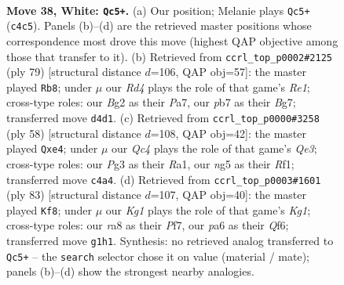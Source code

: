 \documentclass[11pt]{article}
\begin{document}
\clearpage

\begin{figure}[p]\centering
\begin{subfigure}{0.46\textwidth}\centering
\resizebox{\linewidth}{!}{%
\newchessgame
\chessboard[
  setfen={r7/1p4p1/pkn2pN1/6np/2QR4/4P1P1/PPR2PBP/6K1 w - - 5 38},
  showmover=false,
  pgfstyle=straightmove, color=movearrow, markmove={c4-c5}
]}
\caption{}
\end{subfigure}\hfill
\begin{subfigure}{0.46\textwidth}\centering
\resizebox{\linewidth}{!}{%
\newchessgame
\chessboard[
  setfen={4r1k1/p1N1qpb1/3p2p1/P6p/4nP2/4P1P1/2Q4P/2R2BK1 b - - 6 40},
  showmover=false,
  pgfstyle=straightmove, color=movearrow, markmove={e8-b8}
]}
\caption{}
\end{subfigure}
\\[4pt]
\begin{subfigure}{0.46\textwidth}\centering
\resizebox{\linewidth}{!}{%
\newchessgame
\chessboard[
  setfen={1r1q2k1/5pp1/7p/2p5/1p1npP2/1b2Q1P1/1P2B1PK/R4R2 w - - 0 30},
  showmover=false,
  pgfstyle=straightmove, color=movearrow, markmove={e3-e4}
]}
\caption{}
\end{subfigure}\hfill
\begin{subfigure}{0.46\textwidth}\centering
\resizebox{\linewidth}{!}{%
\newchessgame
\chessboard[
  setfen={6k1/p3pp1p/4nq2/2p2r2/2P1QN1P/PP4P1/K2R4/8 b - - 10 42},
  showmover=false,
  pgfstyle=straightmove, color=movearrow, markmove={g8-f8}
]}
\caption{}
\end{subfigure}
\caption{\textbf{Move 38, White: \texttt{Qc5+}.} (a) Our position; Melanie plays \texttt{Qc5+} (\texttt{c4c5}). Panels (b)--(d) are the retrieved master positions whose correspondence most drove this move (highest QAP objective among those that transfer to it). (b) Retrieved from \texttt{ccrl\_top\_p0002\#2125} (ply 79) [structural distance $d$=106, QAP obj=57]: the master played \texttt{Rb8}; under $\mu$ our \emph{Rd4} plays the role of that game's \emph{Re1}; cross-type roles: our \emph{B}g2 as their \emph{P}a7, our \emph{p}b7 as their \emph{B}g7; transferred move \texttt{d4d1}. (c) Retrieved from \texttt{ccrl\_top\_p0000\#3258} (ply 58) [structural distance $d$=108, QAP obj=42]: the master played \texttt{Qxe4}; under $\mu$ our \emph{Qc4} plays the role of that game's \emph{Qe3}; cross-type roles: our \emph{P}g3 as their \emph{R}a1, our \emph{n}g5 as their \emph{R}f1; transferred move \texttt{c4a4}. (d) Retrieved from \texttt{ccrl\_top\_p0003\#1601} (ply 83) [structural distance $d$=107, QAP obj=40]: the master played \texttt{Kf8}; under $\mu$ our \emph{Kg1} plays the role of that game's \emph{Kg1}; cross-type roles: our \emph{r}a8 as their \emph{P}f7, our \emph{p}a6 as their \emph{Q}f6; transferred move \texttt{g1h1}. Synthesis: no retrieved analog transferred to \texttt{Qc5+} -- the \texttt{search} selector chose it on value (material / mate); panels (b)--(d) show the strongest nearby analogies.}
\label{fig:thought-m74}
\end{figure}
\end{document}

